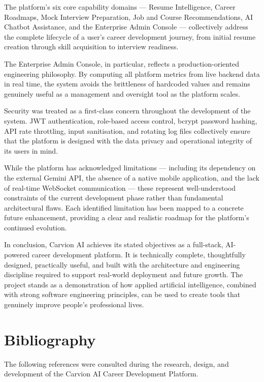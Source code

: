 \documentclass[12pt]{article}
\begin{document}
The platform's six core capability domains — Resume Intelligence, Career Roadmaps, Mock Interview Preparation, Job and Course Recommendations, AI Chatbot Assistance, and the Enterprise Admin Console — collectively address the complete lifecycle of a user's career development journey, from initial resume creation through skill acquisition to interview readiness.

The Enterprise Admin Console, in particular, reflects a production-oriented engineering philosophy. By computing all platform metrics from live backend data in real time, the system avoids the brittleness of hardcoded values and remains genuinely useful as a management and oversight tool as the platform scales.

Security was treated as a first-class concern throughout the development of the system. JWT authentication, role-based access control, bcrypt password hashing, API rate throttling, input sanitisation, and rotating log files collectively ensure that the platform is designed with the data privacy and operational integrity of its users in mind.

While the platform has acknowledged limitations — including its dependency on the external Gemini API, the absence of a native mobile application, and the lack of real-time WebSocket communication — these represent well-understood constraints of the current development phase rather than fundamental architectural flaws. Each identified limitation has been mapped to a concrete future enhancement, providing a clear and realistic roadmap for the platform's continued evolution.

In conclusion, Carvion AI achieves its stated objectives as a full-stack, AI-powered career development platform. It is technically complete, thoughtfully designed, practically useful, and built with the architecture and engineering discipline required to support real-world deployment and future growth. The project stands as a demonstration of how applied artificial intelligence, combined with strong software engineering principles, can be used to create tools that genuinely improve people's professional lives.

\clearpage
\section{Bibliography}

The following references were consulted during the research, design, and development of the Carvion AI Career Development Platform.
\end{document}
